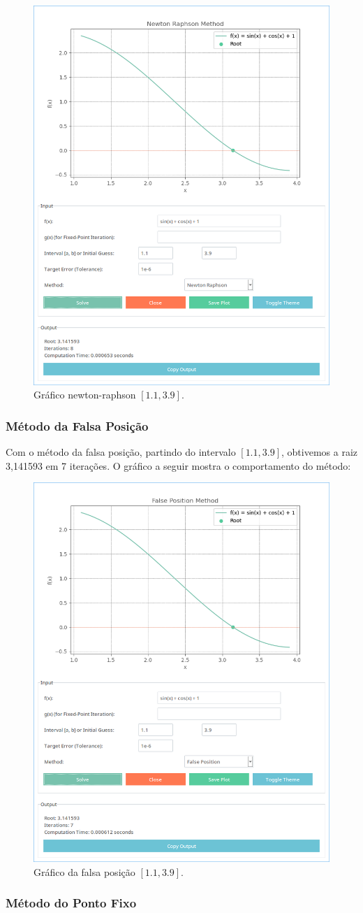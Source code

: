 \begin{figure}[H]
	\centering
	\setlength{\fboxsep}{0pt}
	\includegraphics[height=0.5\textwidth]{./fig/newton-raphson.png}
	\caption{Gráfico newton-raphson $[1.1, 3.9]$.}
	\label{fig:grafico-newton-raphson}
\end{figure}

\subsubsection{\textbf{Método da Falsa Posição}}

Com o método da falsa posição, partindo do intervalo $[1.1, 3.9]$, obtivemos a
raiz 3,141593 em 7 iterações. O gráfico a seguir mostra o comportamento do
método:

\begin{figure}[H]
	\centering
	\setlength{\fboxsep}{0pt}
	\includegraphics[height=0.5\textwidth]{./fig/ponto-falso.png}
	\caption{Gráfico da falsa posição $[1.1, 3.9]$.}
	\label{fig:grafico-fp}
\end{figure}

\subsubsection{\textbf{Método do Ponto Fixo}}

